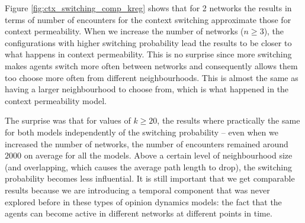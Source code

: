\documentclass[preprint,number]{elsarticle}
\begin{document}
      Figure \ref{fig:ctx_switching_comp_kreg} shows that for 2 networks the results in terms of
      number of encounters for the context switching approximate those for context
      permeability. When we increase the number of networks ($n\ge3$), the configurations with
      higher switching probability lead the results to be closer to what happens in context
      permeability. This is no surprise since more switching makes agents switch more often between
      networks and consequently allows them too choose more often from different
      neighbourhoods. This is almost the same as having a larger neighbourhood to choose from, which
      is what happened in the context permeability model.

      The surprise was that for values of $k \ge 20$, the results where practically the same for
      both models independently of the switching probability -- even when we increased the number of
      networks, the number of encounters remained around $2000$ on average for all the models. Above
      a certain level of neighbourhood size (and overlapping, which causes the average path length
      to drop), the switching probability becomes less influential. It is still important that we
      get comparable results because we are introducing a temporal component that was never explored
      before in these types of opinion dynamics models: the fact that the agents can become active
      in different networks at different points in time.
\end{document}
